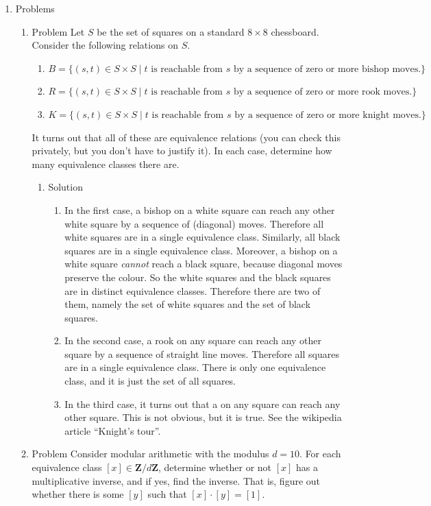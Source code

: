 \documentclass{amsart}
\begin{document}
\begin{enumerate}
\begin{enumerate}
\item If you are having trouble with any of the points, come and discuss with me in office hours.  It is part of my job to help you understand this stuff, so please use my time!
\end{enumerate}
\item Problems
\label{sec:orgf5965af}
\begin{enumerate}
\item Problem
\label{sec:org526419c}
Let \(S\) be the set of squares on a standard \(8 \times 8\) chessboard.
Consider the following relations on \(S\).
\begin{enumerate}
\item \(B = \{(s,t) \in S \times S \mid t \text{ is reachable from }s\text{ by a sequence of zero or more bishop moves.} \}\)
\item \(R = \{(s,t) \in S \times S \mid t \text{ is reachable from }s\text{ by a sequence of zero or more rook moves.} \}\)
\item \(K = \{(s,t) \in S \times S \mid t \text{ is reachable from }s\text{ by a sequence of zero or more knight moves.} \}\)
\end{enumerate}
It turns out that all of these are equivalence relations (you can check this privately, but you don't have to justify it).
In each case, determine how many equivalence classes there are.
\begin{enumerate}
\item Solution
\label{sec:org0ba64ec}
\begin{enumerate}
\item In the first case, a bishop on a white square can reach any other white square by a sequence of (diagonal) moves. Therefore all white squares are in a single equivalence class.
Similarly, all black squares are in a single equivalence class.
Moreover, a bishop on a white square \emph{cannot} reach a black square, because diagonal moves preserve the colour.
So the white squares and the black squares are in distinct equivalence classes.
Therefore there are two of them, namely the set of white squares and the set of black squares.
\item In the second case, a rook on any square can reach any other square by a sequence of straight line moves. Therefore all squares are in a single equivalence class.
There is only one equivalence class, and it is just the set of all squares.
\item In the third case, it turns out that a on any square can reach any other square.  This is not obvious, but it is true.  See the wikipedia article ``Knight's tour''.
\end{enumerate}
\end{enumerate}
\item Problem
\label{sec:org26f2667}
Consider modular arithmetic with the modulus \(d = 10\). For each equivalence class \([x] \in \mathbf{Z}/d \mathbf{Z}\), determine whether or not \([x]\) has a multiplicative inverse, and if yes, find the inverse. 
That is, figure out whether there is some \([y]\) such that \([x]\cdot[y] = [1]\).\\


\end{enumerate}
\end{enumerate}
\end{document}
